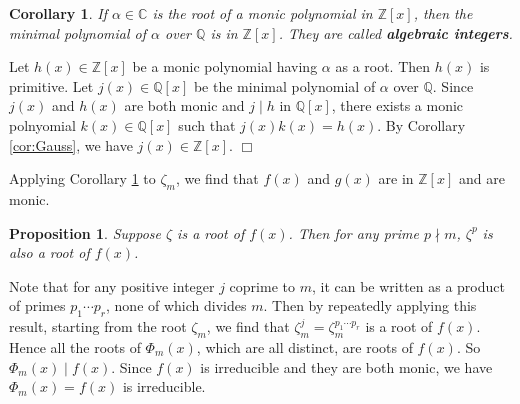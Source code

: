 \documentclass{article}
\def\Z{{\mathbb Z}}
\def\Q{{\mathbb Q}}
\def\Z{{\mathbb Z}}
\def\Q{{\mathbb Q}}
\def\C{{\mathbb C}}
\newtheorem{cor}[subsection]{Corollary}
\newtheorem{proposition}[subsection]{Proposition}
\newenvironment{proof}{\noindent {\bf Proof:}}{$\Box$ \vspace{2 ex}}
\begin{document}
\begin{cor}\label{cor:alg}
    If $\alpha\in\C$ is the root of a monic polynomial in $\Z[x]$, then the minimal polynomial of $\alpha$ over $\Q$ is in $\Z[x]$. They are called \textbf{algebraic integers}.
\end{cor}

\begin{proof}
    Let $h(x)\in\Z[x]$ be a monic polynomial having $\alpha$ as a root. Then $h(x)$ is primitive. Let $j(x)\in\Q[x]$ be the minimal polynomial of $\alpha$ over $\Q$. Since $j(x)$ and $h(x)$ are both monic and $j\mid h$ in $\Q[x]$, there exists a monic polnyomial $k(x)\in\Q[x]$ such that $j(x)k(x) = h(x)$. By Corollary \ref{cor:Gauss}, we have $j(x)\in\Z[x]$.
\end{proof}

Applying Corollary \ref{cor:alg} to $\zeta_m$, we find that $f(x)$ and $g(x)$ are in $\Z[x]$ and are monic.

\begin{proposition}\label{prop:zeta^p}
    Suppose $\zeta$ is a root of $f(x)$. Then for any prime $p\nmid m$, $\zeta^p$ is also a root of $f(x)$.
\end{proposition}

Note that for any positive integer $j$ coprime to $m$, it can be written as a product of primes $p_1\cdots p_r$, none of which divides $m$. Then by repeatedly applying this result, starting from the root $\zeta_m$, we find that $\zeta_m^j = \zeta_m^{p_1\cdots p_r}$ is a root of $f(x)$. Hence all the roots of $\Phi_m(x)$, which are all distinct, are roots of $f(x)$. So $\Phi_m(x) \mid f(x)$. Since $f(x)$ is irreducible and they are both monic, we have $\Phi_m(x) = f(x)$ is irreducible.
\end{document}
